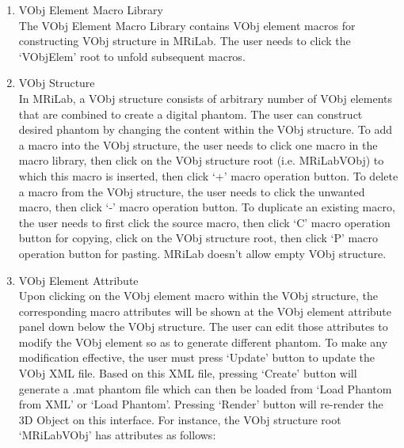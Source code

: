 \documentclass{book}%
\begin{document}
\begin{enumerate}
	\item VObj Element Macro Library \\
The VObj Element Macro Library contains VObj element macros for constructing VObj structure in MRiLab. The user needs to click the `VObjElem' root to unfold subsequent macros.
	
	\item VObj Structure \\
In MRiLab, a VObj structure consists of arbitrary number of VObj elements that are combined to create a digital phantom. The user can construct desired phantom by changing the content within the VObj structure. To add a macro into the VObj structure, the user needs to click one macro in the macro library, then click on the VObj structure root (i.e. MRiLabVObj) to which this macro is inserted, then click `+' macro operation button. To delete a macro from the VObj structure, the user needs to click the unwanted macro, then click `-' macro operation button. To duplicate an existing macro, the user needs to first click the source macro, then click `C' macro operation button for copying, click on the VObj structure root, then click `P' macro operation button for pasting. MRiLab doesn't allow empty VObj structure.

	\item VObj Element Attribute \\
Upon clicking on the VObj element macro within the VObj structure, the corresponding macro attributes will be shown at the VObj element attribute panel down below the VObj structure. The user can edit those attributes to modify the VObj element so as to generate different phantom. To make any modification effective, the user must press `Update' button to update the VObj XML file. Based on this XML file, pressing `Create' button will generate a .mat phantom file which can then be loaded from `Load Phantom from XML' or `Load Phantom'. Pressing `Render' button will re-render the 3D Object on this interface. For instance, the VObj structure root `MRiLabVObj' has attributes as follows:


\end{enumerate}
\end{document}
